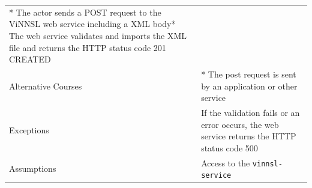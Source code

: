 \begin{longtable}[]{@{}ll@{}}
\begin{minipage}[t]{0.68\columnwidth}
* The actor sends a POST request to the ViNNSL web service including a
XML body* The web service validates and imports the XML file and returns
the HTTP status code 201 CREATED\strut
\end{minipage}\tabularnewline
\begin{minipage}[t]{0.27\columnwidth}\raggedright\strut
Alternative Courses\strut
\end{minipage} & \begin{minipage}[t]{0.68\columnwidth}\raggedright\strut
* The post request is sent by an application or other service\strut
\end{minipage}\tabularnewline
\begin{minipage}[t]{0.27\columnwidth}\raggedright\strut
Exceptions\strut
\end{minipage} & \begin{minipage}[t]{0.68\columnwidth}\raggedright\strut
If the validation fails or an error occurs, the web service returns the
HTTP status code 500\strut
\end{minipage}\tabularnewline
\begin{minipage}[t]{0.27\columnwidth}\raggedright\strut
Assumptions\strut
\end{minipage} & \begin{minipage}[t]{0.68\columnwidth}\raggedright\strut
Access to the \texttt{vinnsl-service}\strut
\end{minipage}\tabularnewline
\bottomrule
\end{longtable}

